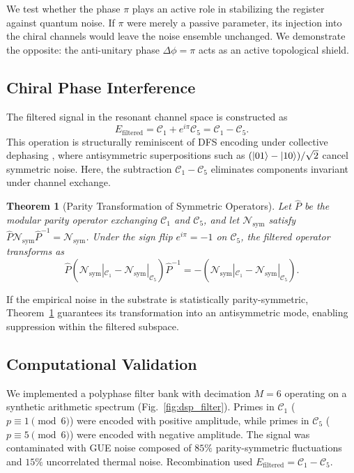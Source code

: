 \documentclass[aps,pra,twocolumn,10pt,superscriptaddress]{revtex4-2}
\newtheorem{theorem}{Theorem}
\begin{document}
We test whether the phase $\pi$ plays an active role in stabilizing the register against quantum noise. If $\pi$ were merely a passive parameter, its injection into the chiral channels would leave the noise ensemble unchanged. We demonstrate the opposite: the anti-unitary phase $\Delta\phi = \pi$ acts as an active topological shield.

\subsection{Chiral Phase Interference}

The filtered signal in the resonant channel space is constructed as
\begin{equation}
E_{\text{filtered}} = \mathcal{C}_1 + e^{i\pi} \mathcal{C}_5 = \mathcal{C}_1 - \mathcal{C}_5.
\label{eq:filter}
\end{equation}
This operation is structurally reminiscent of DFS encoding under collective dephasing \cite{Lidar1998}, where antisymmetric superpositions such as $(\ket{01} - \ket{10})/\sqrt{2}$ cancel symmetric noise. Here, the subtraction $\mathcal{C}_1 - \mathcal{C}_5$ eliminates components invariant under channel exchange.

\begin{theorem}[Parity Transformation of Symmetric Operators]
\label{thm:gue_parity}
Let $\hat{P}$ be the modular parity operator exchanging $\mathcal{C}_1$ and $\mathcal{C}_5$, and let $\mathcal{N}_{\text{sym}}$ satisfy $\hat{P}\mathcal{N}_{\text{sym}}\hat{P}^{-1} = \mathcal{N}_{\text{sym}}$. Under the sign flip $e^{i\pi} = -1$ on $\mathcal{C}_5$, the filtered operator transforms as
\begin{equation}
\hat{P}(\mathcal{N}_{\text{sym}}|_{\mathcal{C}_1} - \mathcal{N}_{\text{sym}}|_{\mathcal{C}_5})\hat{P}^{-1} = -(\mathcal{N}_{\text{sym}}|_{\mathcal{C}_1} - \mathcal{N}_{\text{sym}}|_{\mathcal{C}_5}).
\end{equation}
\end{theorem}

If the empirical noise in the substrate is statistically parity-symmetric, Theorem~\ref{thm:gue_parity} guarantees its transformation into an antisymmetric mode, enabling suppression within the filtered subspace.

\subsection{Computational Validation}

We implemented a polyphase filter bank with decimation $M=6$ operating on a synthetic arithmetic spectrum (Fig.~\ref{fig:dsp_filter}). Primes in $\mathcal{C}_1$ ($p \equiv 1 \pmod 6$) were encoded with positive amplitude, while primes in $\mathcal{C}_5$ ($p \equiv 5 \pmod 6$) were encoded with negative amplitude. The signal was contaminated with GUE noise composed of $85\%$ parity-symmetric fluctuations and $15\%$ uncorrelated thermal noise. Recombination used $E_{\text{filtered}} = \mathcal{C}_1 - \mathcal{C}_5$.
\end{document}
